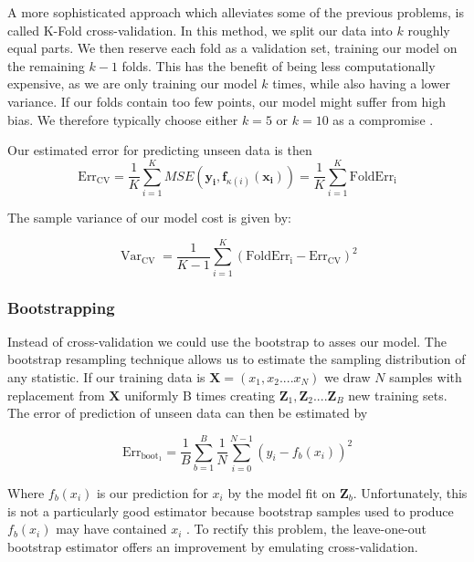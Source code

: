 \documentclass{article}
\DeclareMathOperator*{\Var}{Var}
\begin{document}
A more sophisticated approach which alleviates some of the previous problems, is called K-Fold cross-validation. In this method, we split our data into $k$ roughly equal parts. We then reserve each fold as a validation set, training our model on the remaining $k-1$ folds. This has the benefit of being less computationally expensive, as we are only training our model $k$ times, while also having a lower variance. If our folds contain too few points, our model might suffer from high bias. We therefore typically choose either $k = 5$ or $k = 10$ as a compromise \cite[p.~243]{Hastie2009}.

Our estimated error for predicting unseen data is then
\begin{equation*}
    \text{Err}_{\text{CV}}= \frac{1}{K} \sum_{i=1}^{K}
    MSE(\boldsymbol{y_i},\boldsymbol{f}_{\kappa(i)}(\boldsymbol{x_i})) = \frac{1}{K} \sum_{i=1}^{K} \text{FoldErr}_{\text{i}}
\end{equation*}

The sample variance of our model cost is given by:

\begin{equation*} \Var_{\text{CV}} = \frac{1}{K - 1} \sum_{i=1}^{K}( \text{FoldErr}_{\text{i}} - \text{Err}_{\text{CV}})^2
\end{equation*}



\subsubsection{Bootstrapping}
Instead of cross-validation we could use the bootstrap to asses our model. The bootstrap resampling technique allows us to estimate the sampling distribution of any statistic. If our training data is $\textbf{X} = (x_1, x_2 .... x_N)$ we draw $N$ samples with replacement from $\textbf{X}$ uniformly B times creating $\boldsymbol{Z}_1, \boldsymbol{Z}_2 .... \boldsymbol{Z}_B$ new training sets. The error of prediction of unseen data can then be estimated by 

\begin{equation*}
    \text{Err}_{\text{boot}_1} =  \frac{1}{B} \sum_{b=1}^B \frac{1}{N} \sum_{i = 0}^{N-1} (y_i - f_b(x_i))^2
\end{equation*}

Where $f_b(x_i)$ is our prediction for $x_i$ by the model fit on $\boldsymbol{Z}_b$. Unfortunately, this is not a particularly good estimator because bootstrap samples used to produce $f_b(x_i)$ may have contained $x_i$ \cite[p.~270]{Hastie2009}. To rectify this problem, the leave-one-out bootstrap estimator offers an improvement by emulating cross-validation.
\end{document}

